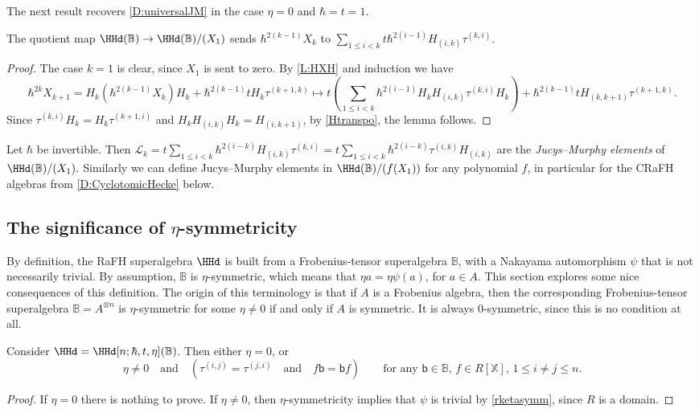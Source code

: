 \documentclass[a4paper,11pt]{amsart}
\numberwithin{equation}{subsection}
\theoremstyle{definition}
\theoremstyle{theorem}
\theoremstyle{remark}
\newcommand\CL{\mathcal{L}}
\newcommand\bb{\mathsf{b}}
\newcommand\X{\mathbb{X}}
\newcommand\RR{R}
\newcommand{\Bo}{\mathbb{B}}
\begin{document}
The next result recovers \autoref{D:universalJM} in the case $\eta=0$ and $\hbar=t=1$.
 \begin{Lemma} \label{evaluation}
 The quotient map $\HHd(\Bo)\rightarrow \HHd(\Bo)/(X_1)$ sends $\hbar^{2(k-1)}X_{k}$ to $\sum_{1\leq i<k}t\hbar^{2(i-1)}H_{(i,k)}\tau^{(k,i)}$.
  \end{Lemma}
 \begin{proof}
 The case $k=1$ is clear, since $X_1$ is sent to zero. By  \autoref{L:HXH} and induction we have
 \[\hbar^{2k}X_{k+1}=H_k(\hbar^{2(k-1)}X_k)H_k+\hbar^{2(k-1)}tH_k\tau^{(k+1,k)}\mapsto
 t\left(\sum_{1\leq i<k}\hbar^{2(i-1)}H_kH_{(i,k)}\tau^{(k,i)}H_k\right)+\hbar^{2(k-1)}tH_{(k,k+1)}\tau^{(k+1,k)}.\]
  Since $\tau^{(k,i)}H_k=H_k\tau^{(k+1,i)}$ and $H_kH_{(i,k)}H_k=H_{(i,k+1)}$, by \autoref{Htranspo}, the lemma follows.
  \end{proof}

\begin{Definition}Let $\hbar$ be invertible.
 Then $\CL_k=t\sum_{1\leq i<k}\hbar^{2(i-k)}H_{(i,k)}\tau^{(k,i)}=t\sum_{1\leq i<k}\hbar^{2(i-k)}\tau^{(i,k)}H_{(i,k)}$ are the \emph{Jucys--Murphy elements} of  $\HHd(\Bo)/(X_1).$
 Similarly we can define Jucys--Murphy elements in $\HHd(\Bo)/(f(X_1))$ for any polynomial $f$, in particular for the CRaFH algebras from \autoref{D:CyclotomicHecke} below.
 \end{Definition}

  \subsection{The significance of $\eta$-symmetricity}\label{S:admissibility}
  By definition, the RaFH superalgebra $\HHd$ is built from a
  Frobenius-tensor superalgebra $\Bo$, with a Nakayama automorphism
  $\psi$ that is not necessarily trivial. By assumption, $\Bo$
  is $\eta$-symmetric, which means that $\eta a=\eta\psi(a)$, for $a\in A$.
  This section explores some nice consequences of this definition. The origin
  of this terminology is that if $A$ is a Frobenius algebra, then the
  corresponding Frobenius-tensor superalgebra $\Bo=A^{\otimes n}$ is
  $\eta$-symmetric for some $\eta\not=0$ if and only if $A$ is symmetric. It is always $0$-symmetric, since this is no condition at all.

  \begin{Lemma}\label{Lfunnyequation}
    Consider $\HHd=\HHd[n;\hbar, t, \eta](\Bo)$. Then either $\eta=0$, or
      \begin{equation}\label{funnyequation}
 \eta\not=0\quad\text{and}\quad  (\tau^{(i,j)}=\tau^{(j,i)}\quad\text{and}\quad  f\bb= \bb f)\quad\quad \text{for any  $\bb\in\Bo$,  $f\in\RR[\X]$, $1\leq i\not=j\leq n$.}
 \end{equation}
  \end{Lemma}
\begin{proof}
  If $\eta=0$ there is nothing to prove. If $\eta\ne0$, then $\eta$-symmetricity implies that $\psi$ is
  trivial by \autoref{rketasymm}, since $\RR$ is a domain.
\end{proof}
\end{document}
